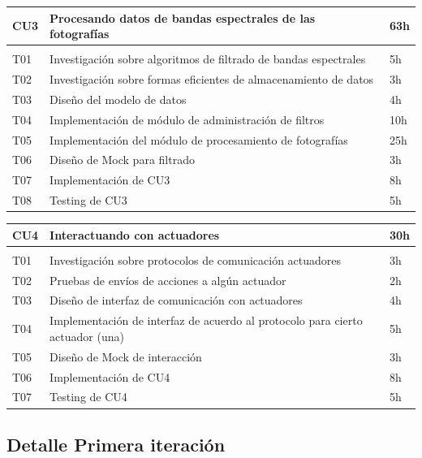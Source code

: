 \begin{table}[h!]
    \begin{tabular}{lll}
	\hline
	CU3 & Procesando datos de bandas espectrales de las fotografías & 63h \\
	\hline \\
	T01 & Investigación sobre algoritmos de filtrado de bandas espectrales & 5h \\
	T02 & Investigación sobre formas eficientes de almacenamiento de datos & 3h \\
	T03 & Diseño del modelo de datos & 4h \\
	T04 & Implementación de módulo de administración de filtros & 10h \\
	T05 & Implementación del módulo de procesamiento de fotografías & 25h \\
	T06 & Diseño de Mock para filtrado & 3h \\
	T07 & Implementación de CU3 & 8h \\
	T08 & Testing de CU3 & 5h \\
	\hline
    \end{tabular}
\end{table}

\begin{table}[h!]
    \begin{tabular}{lll}
	\hline
	CU4 & Interactuando con actuadores & 30h \\
	\hline \\
	T01 & Investigación sobre protocolos de comunicación actuadores & 3h \\
	T02 & Pruebas de envíos de acciones a algún actuador & 2h \\
	T03 & Diseño de interfaz de comunicación con actuadores & 4h \\
	T04 & Implementación de interfaz de acuerdo al protocolo para cierto actuador (una) & 5h \\
	T05 & Diseño de Mock de interacción & 3h \\
	T06 & Implementación de CU4 & 8h \\
	T07 & Testing de CU4 & 5h \\
	\hline
    \end{tabular}
\end{table}

\subsection{Detalle Primera iteración}


